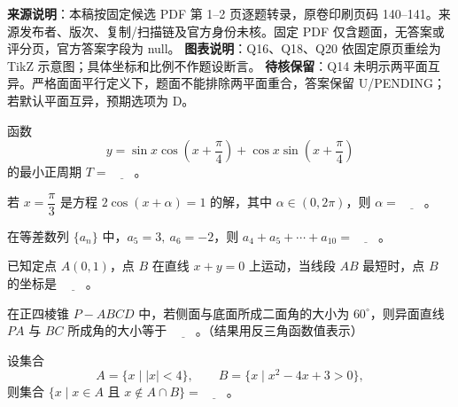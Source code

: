 

\begin{gktip}
\textbf{来源说明}：本稿按固定候选 PDF 第 1–2 页逐题转录，原卷印刷页码 140–141。来源发布者、版次、复制/扫描链及官方身份未核。固定 PDF 仅含题面，无答案或评分页，官方答案字段为 null。
\textbf{图表说明}：Q16、Q18、Q20 依固定原页重绘为 TikZ 示意图；具体坐标和比例不作题设断言。
\textbf{待核保留}：Q14 未明示两平面互异。严格面面平行定义下，题面不能排除两平面重合，答案保留 U/PENDING；若默认平面互异，预期选项为 D。
\end{gktip}


\begin{question}
函数
\nopagebreak[4]
\[
   y=\sin x\cos\left(x+\frac{\pi}{4}\right)+\cos x\sin\left(x+\frac{\pi}{4}\right)
\]
   的最小正周期 \(T=\underline{\qquad}\)。

\end{question}
\begin{question}
若 \(x=\dfrac{\pi}{3}\) 是方程 \(2\cos(x+\alpha)=1\) 的解，其中 \(\alpha\in(0,2\pi)\)，则 \(\alpha=\underline{\qquad}\)。

\end{question}
\begin{question}
在等差数列 \(\{a_n\}\) 中，\(a_5=3,\ a_6=-2\)，则 \(a_4+a_5+\cdots+a_{10}=\underline{\qquad}\)。

\end{question}
\begin{question}
已知定点 \(A(0,1)\)，点 \(B\) 在直线 \(x+y=0\) 上运动，当线段 \(AB\) 最短时，点 \(B\) 的坐标是 \(\underline{\qquad}\)。

\end{question}
\begin{question}
在正四棱锥 \(P-ABCD\) 中，若侧面与底面所成二面角的大小为 \(60^\circ\)，则异面直线 \(PA\) 与 \(BC\) 所成角的大小等于 \(\underline{\qquad}\)。（结果用反三角函数值表示）

\end{question}
\begin{question}
设集合
\nopagebreak[4]
\[
   A=\{x\mid |x|<4\},\qquad B=\{x\mid x^2-4x+3>0\},
\]
   则集合 \(\{x\mid x\in A\text{ 且 }x\notin A\cap B\}=\underline{\qquad}\)。

\end{question}
